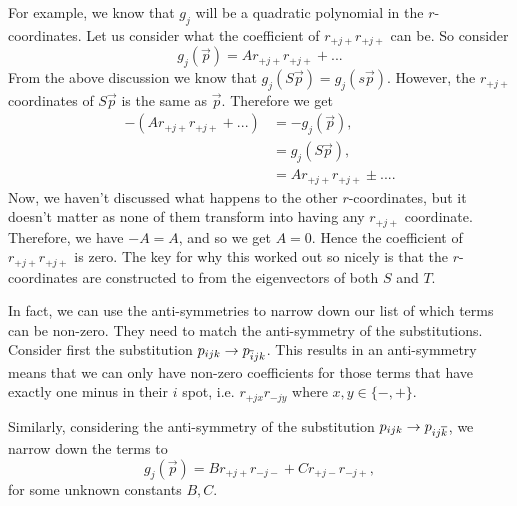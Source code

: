 For example, we know that \(g_j\) will be a quadratic polynomial in the \(r\)-coordinates. Let us consider
what the coefficient of \(r_{+j+}r_{+j+}\) can be. So consider
\begin{equation}
g_j(\vec p) = A r_{+j+}r_{+j+} + ...
\end{equation} 
From the above discussion we know that \(g_j(S\vec p) = g_j(s\vec p)\). However, the \(r_{+j+}\) coordinates
of \(S\vec p\) is the same as \(\vec p\). Therefore we get
\begin{align}
-(A r_{+j+}r_{+j+} + ...) & = -g_j(\vec p), \\
& = g_j(S\vec p), \\
& = A r_{+j+}r_{+j+} \pm ....
\end{align}
Now, we haven't discussed what happens to the other \(r\)-coordinates, but it doesn't matter as none of them
transform into having any \(r_{+j+}\) coordinate. Therefore, we have \(-A = A\), and so we get \(A = 0\).
Hence the coefficient of \(r_{+j+}r_{+j+}\) is zero. The key for why this worked out so nicely is that the
\(r\)-coordinates are constructed to from the eigenvectors of both \(S\) and \(T\). 

In fact, we can use the anti-symmetries to narrow down our list of which terms can be non-zero. They need
to match the anti-symmetry of the substitutions. Consider first the substitution \(p_{ijk} \to p_{\overline{i}jk}\).
This results in an anti-symmetry means that we can only have non-zero coefficients for those terms that
have exactly one minus in their \(i\) spot, i.e. \(r_{+jx}r_{-jy}\) where \(x,y \in \{-, +\}\).

Similarly, considering the anti-symmetry of the substitution \(p_{ijk} \to p_{ij\overline{k}}\), we narrow
down the terms to
\begin{equation}
g_j(\vec p) = B r_{+j+}r_{-j-} + C r_{+j-}r_{-j+},
\end{equation}
for some unknown constants \(B, C\).


